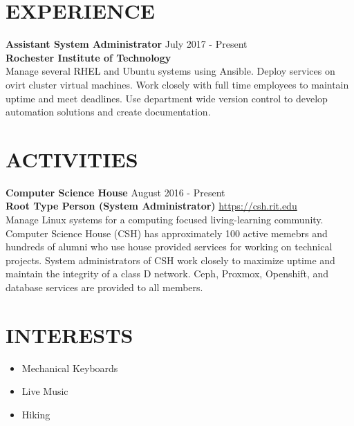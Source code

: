 \documentclass[line, margin]{res}
\begin{document}
\begin{resume}
\section{EXPERIENCE}
{\bf \large{Assistant System Administrator}} \hfill July 2017 - Present \\
{\bf Rochester Institute of Technology} \\
Manage several RHEL and Ubuntu systems using Ansible.  Deploy services on ovirt cluster virtual machines.  Work closely with full
time employees to maintain uptime and meet deadlines.  Use department wide version control to develop automation solutions and create documentation. \\

\section{ACTIVITIES}
{\bf \large{Computer Science House}} \hfill August 2016 - Present \\
{\bf Root Type Person (System Administrator)} \hfill \url{https://csh.rit.edu} \\
Manage Linux systems for a computing focused living-learning community.
Computer Science House (CSH) has approximately 100 active memebrs and hundreds of alumni
who use house provided services for working on technical projects.  System administrators of CSH
work closely to maximize uptime and maintain the integrity of a class D network.  Ceph, Proxmox,
Openshift, and database services are provided to all members.

\section{INTERESTS}
\begin{itemize}
    \item Mechanical Keyboards
    \item Live Music
    \item Hiking
\end{itemize}

\end{resume}
\end{document}

